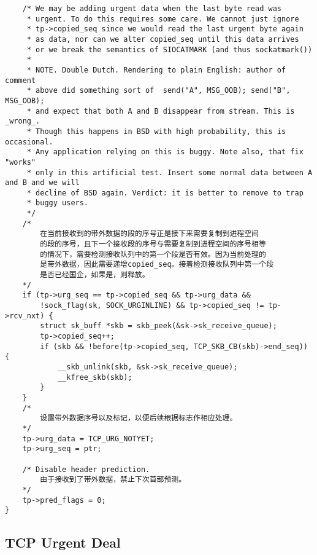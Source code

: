 \begin{verbatim}
    /* We may be adding urgent data when the last byte read was
     * urgent. To do this requires some care. We cannot just ignore
     * tp->copied_seq since we would read the last urgent byte again
     * as data, nor can we alter copied_seq until this data arrives
     * or we break the semantics of SIOCATMARK (and thus sockatmark())
     *
     * NOTE. Double Dutch. Rendering to plain English: author of comment
     * above did something sort of  send("A", MSG_OOB); send("B", MSG_OOB);
     * and expect that both A and B disappear from stream. This is _wrong_.
     * Though this happens in BSD with high probability, this is occasional.
     * Any application relying on this is buggy. Note also, that fix "works"
     * only in this artificial test. Insert some normal data between A and B and we will
     * decline of BSD again. Verdict: it is better to remove to trap
     * buggy users.
     */
    /*
        在当前接收到的带外数据的段的序号正是接下来需要复制到进程空间
        的段的序号，且下一个接收段的序号与需要复制到进程空间的序号相等
        的情况下，需要检测接收队列中的第一个段是否有效。因为当前处理的
        是带外数据，因此需要递增copied_seq。接着检测接收队列中第一个段
        是否已经国企，如果是，则释放。
    */
    if (tp->urg_seq == tp->copied_seq && tp->urg_data &&
        !sock_flag(sk, SOCK_URGINLINE) && tp->copied_seq != tp->rcv_nxt) {
        struct sk_buff *skb = skb_peek(&sk->sk_receive_queue);
        tp->copied_seq++;
        if (skb && !before(tp->copied_seq, TCP_SKB_CB(skb)->end_seq)) {
            __skb_unlink(skb, &sk->sk_receive_queue);
            __kfree_skb(skb);
        }
    }
    /*
        设置带外数据序号以及标记，以便后续根据标志作相应处理。
    */
    tp->urg_data = TCP_URG_NOTYET;
    tp->urg_seq = ptr;

    /* Disable header prediction. 
        由于接收到了带外数据，禁止下次首部预测。    
    */
    tp->pred_flags = 0;
}
\end{verbatim}
	\subsection{TCP Urgent Deal}
